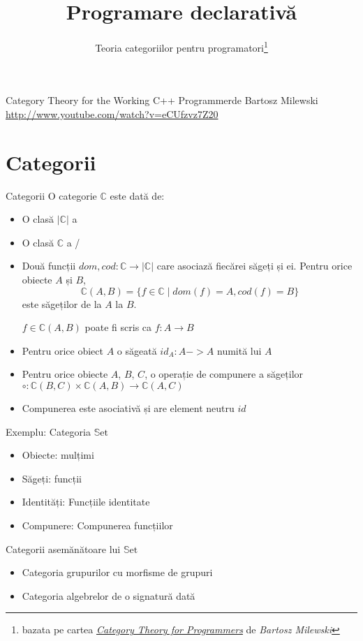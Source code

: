 \documentclass[xcolor=pdftex,romanian,colorlinks]{beamer}
\title[PD---Intrare/Ieșire]{Programare declarativă}
\subtitle{Teoria categoriilor pentru programatori\thanks{bazata pe cartea \emph{\href{http://bartoszmilewski.com/2014/10/28/category-theory-for-programmers-the-preface/}{Category Theory for Programmers}} de \emph{Bartosz Milewski}}}
\begin{document}
\begin{frame}
  \titlepage
\end{frame}

\begin{frame}[fragile]{Category Theory for the Working C++ Programmer}{de Bartosz Milewski}
\href{https://www.youtube.com/watch?v=eCUfzvz7Z20}{http://www.youtube.com/watch?v=eCUfzvz7Z20}
\end{frame}

\section{Categorii}

\begin{frame}[fragile]{Categorii}
O categorie $\mathbb{C}$ este dată de:
\begin{itemize}
\item O clasă $|\mathbb{C}|$ a  
\item O clasă $\mathbb{C}$ a  / 
\item Două funcții $\mathit{dom}, \mathit{cod} : \mathbb{C} \rightarrow |\mathbb{C}|$ care asociază fiecărei săgeți  și  ei.  Pentru orice obiecte $A$ și $B$, \[\mathbb{C}(A,B) = \{f\in \mathbb{C}\mid \mathit{dom}(f) = A, \mathit{cod}(f) = B\}\] este  săgeților  de la $A$ la $B$.

$f\in \mathbb{C}(A,B)$ poate fi scris ca $f : A \rightarrow B$ 
\item Pentru orice obiect $A$ o săgeată $\mathit{id}_A : A -> A$ numită  lui $A$
\item Pentru orice obiecte $A$, $B$, $C$, o operație de compunere a săgeților
$\circ : \mathbb{C}(B,C) \times \mathbb{C}(A,B) \rightarrow \mathbb{C}(A,C)$

\item Compunerea este asociativă și are element neutru $\textit{id}$
\end{itemize}
\end{frame}


\begin{frame}{Exemplu: Categoria $\mathrm{\mathbb{S}et}$}
\begin{itemize}
\item Obiecte: mulțimi
\item Săgeți: funcții
\item Identități:  Funcțiile identitate
\item Compunere: Compunerea funcțiilor
\end{itemize}

\begin{block}{Categorii asemănătoare lui $\mathrm{\mathbb{S}et}$}
\begin{itemize}
\item Categoria grupurilor cu morfisme de grupuri
\item Categoria algebrelor de o signatură dată
\end{itemize}
\end{block}
\end{frame}
\end{document}
